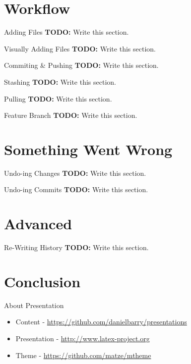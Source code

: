 \documentclass{beamer}
\begin{document}
  \section{Workflow}
  \begin{frame}{Adding Files}
    \textbf{TODO:} Write this section.
  \end{frame}
  \begin{frame}{Visually Adding Files}
    \textbf{TODO:} Write this section.
  \end{frame}
  \begin{frame}{Commiting \& Pushing}
    \textbf{TODO:} Write this section.
  \end{frame}
  \begin{frame}{Stashing}
    \textbf{TODO:} Write this section.
  \end{frame}
  \begin{frame}{Pulling}
    \textbf{TODO:} Write this section.
  \end{frame}
  \begin{frame}{Feature Branch}
    \textbf{TODO:} Write this section.
  \end{frame}
  \section{Something Went Wrong}
  \begin{frame}{Undo-ing Changes}
    \textbf{TODO:} Write this section.
  \end{frame}
  \begin{frame}{Undo-ing Commits}
    \textbf{TODO:} Write this section.
  \end{frame}
  \section{Advanced}
  \begin{frame}{Re-Writing History}
    \textbf{TODO:} Write this section.
  \end{frame}
  \section{Conclusion}
  \begin{frame}{About Presentation}
    \begin{itemize}
      \item Content - \url{https://github.com/danielbarry/presentations}
      \item Presentation - \url{http://www.latex-project.org}
      \item Theme - \url{https://github.com/matze/mtheme}
    \end{itemize}
  \end{frame}
\end{document}
